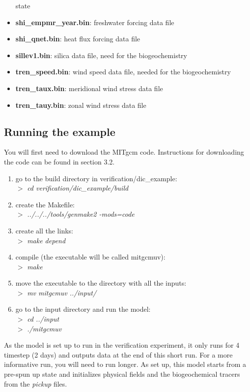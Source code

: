 \begin{itemize}
  state
\item {\bf shi\_empmr\_year.bin}: freshwater forcing data file
\item {\bf shi\_qnet.bin}: heat flux forcing data file
\item {\bf sillev1.bin}: silica data file, need for the
  biogeochemistry
\item {\bf tren\_speed.bin}: wind speed data file, needed for the
  biogeochemistry
\item {\bf tren\_taux.bin}: meridional wind stress data file
\item {\bf tren\_tauy.bin}: zonal wind stress data file
\end{itemize}


\subsection{Running the example}

You will first need to download the MITgcm code. Instructions for
downloading the code can be found in section 3.2.

\begin{enumerate}
\item{go to the build directory in verification/dic\_example:\\
    \hspace{1cm} $>$ {\it cd verification/dic\_example/build}}
\item{create the Makefile:\\
    \hspace{1cm} $>$ {\it ../../../tools/genmake2 -mods=code}}
\item{create all the links:\\
    \hspace{1cm} $>$ {\it make depend}}
\item{compile (the executable will be called mitgcmuv):\\
    \hspace{1cm} $>$ {\it make}}
\item{move the executable to the directory with all the inputs:\\
    \hspace{1cm} $>$ {\it mv mitgcmuv ../input/}}
\item{go to the input directory and run the model:\\
    \hspace{1cm} $>$ {\it cd ../input}\\
    \hspace{1cm} $>$ {\it ./mitgcmuv}}
\end{enumerate}
As the model is set up to run in the verification experiment, it only
runs for 4 timestep (2 days) and outputs data at the end of this short
run. For a more informative run, you will need to run longer. As set
up, this model starts from a pre-spun up state and initializes
physical fields and the biogeochemical tracers from the {\it pickup}
files.

